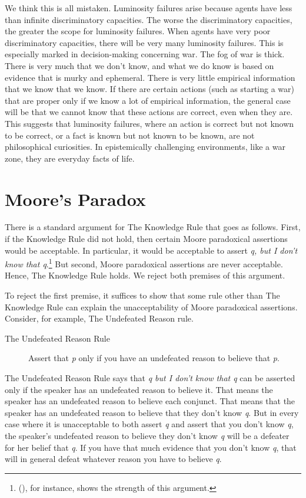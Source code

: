 \documentclass[
  11pt,
  letterpaper,
  DIV=11,
  numbers=noendperiod]{scrartcl}
\begin{document}
We think this is all mistaken. Luminosity failures arise because agents
have less than infinite discriminatory capacities. The worse the
discriminatory capacities, the greater the scope for luminosity
failures. When agents have very poor discriminatory capacities, there
will be very many luminosity failures. This is especially marked in
decision-making concerning war. The fog of war is thick. There is very
much that we don't know, and what we do know is based on evidence that
is murky and ephemeral. There is very little empirical information that
we know that we know. If there are certain actions (such as starting a
war) that are proper only if we know a lot of empirical information, the
general case will be that we cannot know that these actions are correct,
even when they are. This suggests that luminosity failures, where an
action is correct but not known to be correct, or a fact is known but
not known to be known, are not philosophical curiosities. In
epistemically challenging environments, like a war zone, they are
everyday facts of life.

\section{Moore's Paradox}\label{moores-paradox}

There is a standard argument for The Knowledge Rule that goes as
follows. First, if the Knowledge Rule did not hold, then certain Moore
paradoxical assertions would be acceptable. In particular, it would be
acceptable to assert \emph{q, but I don't know that q}.\footnote{(), for instance, shows the strength of this argument.} But
second, Moore paradoxical assertions are never acceptable. Hence, The
Knowledge Rule holds. We reject both premises of this argument.

To reject the first premise, it suffices to show that some rule other
than The Knowledge Rule can explain the unacceptability of Moore
paradoxical assertions. Consider, for example, The Undefeated Reason
rule.

\begin{description}
\item[The Undefeated Reason Rule]
Assert that \emph{p} only if you have an undefeated reason to believe
that \emph{p}.
\end{description}

The Undefeated Reason Rule says that \emph{q but I don't know that q}
can be asserted only if the speaker has an undefeated reason to believe
it. That means the speaker has an undefeated reason to believe each
conjunct. That means that the speaker has an undefeated reason to
believe that they don't know \emph{q}. But in every case where it is
unacceptable to both assert \emph{q} and assert that you don't know
\emph{q}, the speaker's undefeated reason to believe they don't know
\emph{q} will be a defeater for her belief that \emph{q}. If you have
that much evidence that you don't know \emph{q}, that will in general
defeat whatever reason you have to believe \emph{q}.
\end{document}
